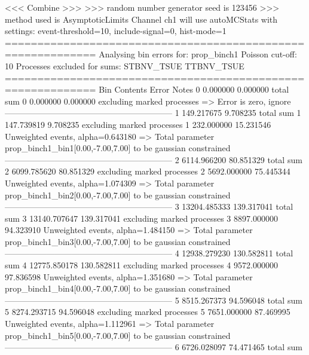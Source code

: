  <<< Combine >>> 
>>> random number generator seed is 123456
>>> method used is AsymptoticLimits
Channel ch1 will use autoMCStats with settings: event-threshold=10, include-signal=0, hist-mode=1
============================================================
Analysing bin errors for: prop_binch1
Poisson cut-off: 10
Processes excluded for sums: STBNV_TSUE TTBNV_TSUE
============================================================
Bin        Contents        Error           Notes                         
0          0.000000        0.000000        total sum                     
0          0.000000        0.000000        excluding marked processes    
  => Error is zero, ignore      
------------------------------------------------------------
1          149.217675      9.708235        total sum                     
1          147.739819      9.708235        excluding marked processes    
1          232.000000      15.231546       Unweighted events, alpha=0.643180
  => Total parameter prop_binch1_bin1[0.00,-7.00,7.00] to be gaussian constrained
------------------------------------------------------------
2          6114.966200     80.851329       total sum                     
2          6099.785620     80.851329       excluding marked processes    
2          5692.000000     75.445344       Unweighted events, alpha=1.074309
  => Total parameter prop_binch1_bin2[0.00,-7.00,7.00] to be gaussian constrained
------------------------------------------------------------
3          13204.485333    139.317041      total sum                     
3          13140.707647    139.317041      excluding marked processes    
3          8897.000000     94.323910       Unweighted events, alpha=1.484150
  => Total parameter prop_binch1_bin3[0.00,-7.00,7.00] to be gaussian constrained
------------------------------------------------------------
4          12938.279230    130.582811      total sum                     
4          12775.850178    130.582811      excluding marked processes    
4          9572.000000     97.836598       Unweighted events, alpha=1.351680
  => Total parameter prop_binch1_bin4[0.00,-7.00,7.00] to be gaussian constrained
------------------------------------------------------------
5          8515.267373     94.596048       total sum                     
5          8274.293715     94.596048       excluding marked processes    
5          7651.000000     87.469995       Unweighted events, alpha=1.112961
  => Total parameter prop_binch1_bin5[0.00,-7.00,7.00] to be gaussian constrained
------------------------------------------------------------
6          6726.028097     74.471465       total sum                     
